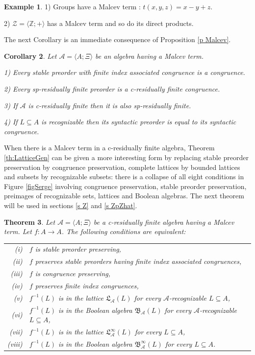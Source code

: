 \documentclass[11pt,a4paper]{article}
\newtheorem{theorem}{Theorem}[section]
\newtheorem{corollary}[theorem]{Corollary}
\theoremstyle{definition} %
\newtheorem{example}[theorem]{Example}
\newcommand\+[1]{\mathcal{#1}} %
\newcommand{\Z}{{\mathbb Z}}     %
\newcommand{\Bool}{{\mathfrak{B}}}   %
\newcommand{\Latt}{{\mathfrak{L}}}
\begin{document}
%
\begin{example}\label{ex Malcev} 1) Groups have a Malcev term : $t(x,y,z)= x-y+z$.

2) $\+Z= \langle \Z; + \rangle$ has a Malcev term and so do its  direct products.
\end{example}
%
The next Corollary is an immediate consequence of Proposition \ref{p Malcev}.
\begin{corollary}\label{coro:stable finite index preorder in group}
Let $\+A = \langle A;\Xi\rangle$ be an algebra having a Malcev term.

 1) Every stable preorder with finite index associated congruence is a congruence.

2) Every sp-residually finite preorder is a c-residually finite congruence.

3) If $\+A$ is c-residually finite then it is also sp-residually finite.

4) If $L\subseteq A$ is recognizable then its syntactic preorder is equal to its syntactic congruence. 
\end{corollary}

When there is a Malcev term in a c-residually finite algebra, Theorem \ref{th:LatticeGen} can be given a more interesting  form  by replacing stable preorder preservation by congruence preservation, complete lattices by bounded lattices and subsets by recognizable subsets:
there is a collapse of  all eight  conditions in Figure \ref{figSerge} involving 
congruence preservation, stable preorder preservation,
preimages of recognizable sets, lattices and Boolean algebras. The next theorem will be used in sections \ref{s Z} and \ref{s ZpZhat}.

\begin{theorem}\label{th:RecLatGeneralGroup} 
Let $\+A = \langle A;\Xi\rangle$ be a  c-residually finite algebra
having a Malcev term.  
Let $f\colon  A\to A$. The following conditions are equivalent:

%
\begin{tabular}{ r  l }
(i) & $f$ is stable preorder preserving,
\\
(ii) & $f$ preserves stable preorders having finite index associated congruences,
\\
(iii) & $f$ is congruence preserving,
\\
(iv) &
$f$ preserves finite index congruences,
\\
(v) & $f^{-1}(L)$ is in the lattice $\Latt_{\+A}(L)$ for every $\+A$-recognizable $L\subseteq A$,
\\
(vi) &
 $f^{-1}(L)$ is in the Boolean algebra $\Bool_{\+A}(L)$ for every $\+A$-recognizable 
$L\subseteq A$,
\\
(vii) &  $f^{-1}(L)$ is in the lattice $\Latt^\infty_{\+A}(L)$ for every $L\subseteq A$,
\\
(viii) &  $f^{-1}(L)$ is in the Boolean algebra $\Bool^\infty_{\+A}(L)$ for every $L\subseteq A$.
\end{tabular}
\end{theorem}
\end{document}

